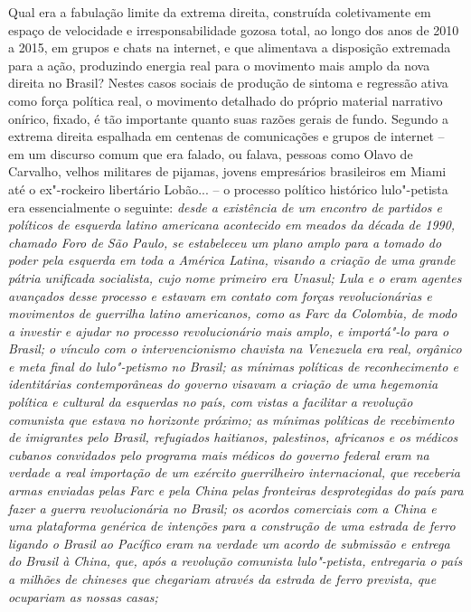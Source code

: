 Qual era a fabulação limite da extrema direita, construída coletivamente
em espaço de velocidade e irresponsabilidade gozosa total, ao longo dos
anos de 2010 a 2015, em grupos e chats na internet, e que alimentava a
disposição extremada para a ação, produzindo energia real para o
movimento mais amplo da nova direita no Brasil? Nestes casos sociais de
produção de sintoma e regressão ativa como força política real, o
movimento detalhado do próprio material narrativo onírico, fixado, é tão
importante quanto suas razões gerais de fundo. Segundo a extrema direita
espalhada em centenas de comunicações e grupos de internet -- em um
discurso comum que era falado, ou falava, pessoas como Olavo de
Carvalho, velhos militares de pijamas, jovens empresários brasileiros em
Miami até o ex"-rockeiro libertário Lobão... -- o processo político
histórico lulo"-petista era essencialmente o seguinte: \emph{desde a
existência de um encontro de partidos e políticos de esquerda latino
americana acontecido em meados da década de 1990, chamado Foro de São
Paulo, se estabeleceu um plano amplo para a tomado do poder pela
esquerda em toda a América Latina, visando a criação de uma grande
pátria unificada socialista, cujo nome primeiro era Unasul; Lula e o 
eram agentes avançados desse processo e estavam em contato com forças
revolucionárias e movimentos de guerrilha latino americanos, como as
Farc da Colombia, de modo a investir e ajudar no processo revolucionário
mais amplo, e importá"-lo para o Brasil; o vínculo com o intervencionismo
chavista na Venezuela era real, orgânico e meta final do lulo"-petismo no
Brasil; as mínimas políticas de reconhecimento e identitárias
contemporâneas do governo visavam a criação de uma hegemonia política e
cultural da esquerdas no país, com vistas a facilitar a revolução
comunista que estava no horizonte próximo; as mínimas políticas de
recebimento de imigrantes pelo Brasil, refugiados haitianos, palestinos,
africanos e os médicos cubanos convidados pelo programa mais médicos do
governo federal eram na verdade a real importação de um exército
guerrilheiro internacional, que receberia armas enviadas pelas Farc e
pela China pelas fronteiras desprotegidas do país para fazer a guerra
revolucionária no Brasil; os acordos comerciais com a China e uma
plataforma genérica de intenções para a construção de uma estrada de
ferro ligando o Brasil ao Pacífico eram na verdade um acordo de
submissão e entrega do Brasil à China, que, após a revolução comunista
lulo"-petista, entregaria o país a milhões de chineses que chegariam
através da estrada de ferro prevista, que ocupariam as nossas casas;
}
